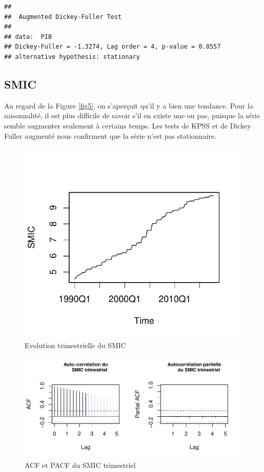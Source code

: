 \documentclass[11pt,]{article}
\begin{document}
\begin{verbatim}
## 
##  Augmented Dickey-Fuller Test
## 
## data:  PIB
## Dickey-Fuller = -1.3274, Lag order = 4, p-value = 0.8557
## alternative hypothesis: stationary
\end{verbatim}

\subsection{SMIC}\label{smic}

Au regard de la Figure \ref{fig5}, on s'aperçoit qu'il y a bien une
tendance. Pour la saisonnalité, il est plus difficile de savoir s'il en
existe une ou pas, puisque la série semble augmenter seulement à
certains temps. Les tests de KPSS et de Dickey Fuller augmenté nous
confirment que la série n'est pas stationnaire.

\begin{figure}

{\centering \includegraphics{Rapport_final_files/figure-latex/unnamed-chunk-5-1} 

}

\caption{\label{fig5} Evolution trimestrielle du SMIC}\label{fig:unnamed-chunk-5}
\end{figure}

\begin{figure}[htbp]
\centering
\includegraphics{Rapport_final_files/figure-latex/unnamed-chunk-6-1.pdf}
\caption{\label{fig6} ACF et PACF du SMIC trimestriel}
\end{figure}
\end{document}
